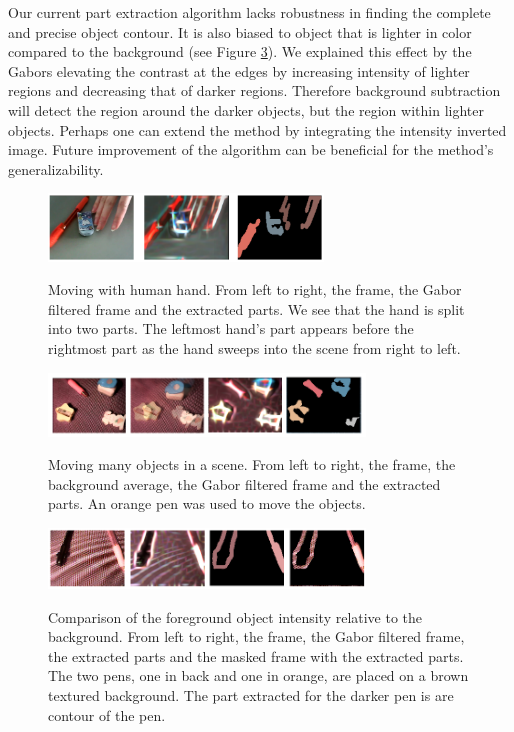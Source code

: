 \documentclass{article}
\begin{document}
Our current part extraction algorithm lacks robustness in finding the complete and precise object contour. It is also biased to object that is lighter in color compared to the background (see Figure \ref{figure:int}). We explained this effect by the Gabors elevating the contrast at the edges by increasing intensity of lighter regions and decreasing that of darker regions. Therefore background subtraction will detect the region around the darker objects, but the region within lighter objects. Perhaps one can extend the method by integrating the intensity inverted image. Future improvement of the algorithm can be beneficial for the method's generalizability.

\begin{figure}[tbp]
\begin{center}
\caption{Moving with human hand. From left to right, the frame, the Gabor filtered frame and the extracted parts. We see that the hand is split into two parts. The leftmost hand's part appears before the rightmost part as the hand sweeps into the scene from right to left.}
  \includegraphics[width=0.65\textwidth]{5}
\label{figure:hand}
\end{center}
\end{figure}

\begin{figure}[tbp]
\begin{center}
\caption{Moving many objects in a scene. From left to right, the frame, the background average, the Gabor filtered frame and the extracted parts. An orange pen was used to move the objects.}
  \includegraphics[width=0.75\textwidth]{6}
\label{figure:many}
\end{center}
\end{figure}

\begin{figure}[tbp]
\begin{center}
\caption{Comparison of the foreground object intensity relative to the background. From left to right, the frame, the Gabor filtered frame, the extracted parts and the masked frame with the extracted parts. The two pens, one in back and one in orange, are placed on a brown textured background. The part extracted for the darker pen is are contour of the pen.}
  \includegraphics[width=0.75\textwidth]{4}
\label{figure:int}
\end{center}
\end{figure}
\end{document}
